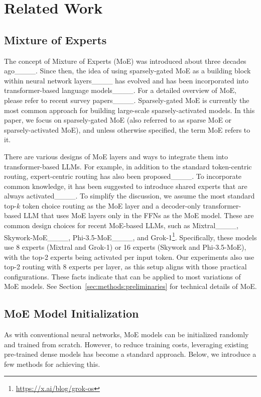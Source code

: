 \section{Related Work}
\subsection{Mixture of Experts}
\label{sec:related_works:moe}

%
%
The concept of Mixture of Experts (MoE) was introduced about three decades ago____. Since then, the idea of using sparsely-gated MoE as a building block within neural network layers____ has evolved and has been incorporated into transformer-based language models____. For a detailed overview of MoE, please refer to recent survey papers____.
Sparsely-gated MoE is currently the most common approach for building large-scale sparsely-activated models.
In this paper, we focus on sparsely-gated MoE (also referred to as sparse MoE or sparsely-activated MoE), and unless otherwise specified, the term MoE refers to it.




There are various designs of MoE layers and ways to integrate them into transformer-based LLMs. For example, in addition to the standard token-centric routing, expert-centric routing has also been proposed____. To incorporate common knowledge, it has been suggested to introduce shared experts that are always activated____. To simplify the discussion, %
we assume the most standard top-$k$ token choice routing as the MoE layer and a decoder-only transformer-based LLM that uses MoE layers only in the FFNs as the MoE model. 
These are common design choices for recent MoE-based LLMs, such as Mixtral____, Skywork-MoE____, Phi-3.5-MoE____, and Grok-1\footnote{\url{https://x.ai/blog/grok-os}}. 
%
Specifically, these models use 8 experts (Mixtral and Grok-1) or 16 experts (Skywork and Phi-3.5-MoE), with the top-2 experts being activated per input token. Our experiments also use top-2 routing with 8 experts per layer, as this setup aligns with those practical configurations.
These facts indicate that \methodname{} can be applied to most variations of MoE models.
%
See Section~\ref{sec:methods:preliminaries} for technical details of MoE.





\subsection{MoE Model Initialization}
As with conventional neural networks, MoE models can be initialized randomly and trained from scratch. However, to reduce training costs, leveraging existing pre-trained dense models has become a standard approach. Below, we introduce a few methods for achieving this.


